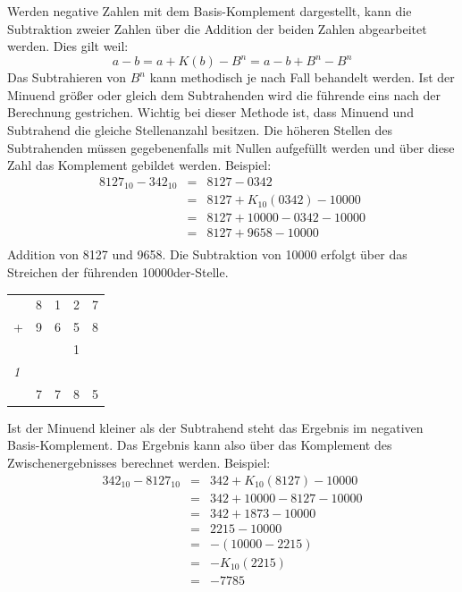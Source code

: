 \documentclass[11pt,a4paper]{scrreprt}
\begin{document}
Werden negative Zahlen mit dem Basis-Komplement dargestellt, kann die Subtraktion zweier Zahlen über die Addition der beiden Zahlen abgearbeitet werden. Dies gilt weil:
$$
  a - b = a + K(b) - B^n = a - b + B^n - B^n
$$
Das Subtrahieren von $B^n$ kann methodisch je nach Fall behandelt werden. Ist der Minuend größer oder gleich dem Subtrahenden  wird die führende eins nach der Berechnung gestrichen. Wichtig bei dieser Methode ist, dass Minuend und Subtrahend die gleiche Stellenanzahl besitzen. Die höheren Stellen des Subtrahenden müssen gegebenenfalls mit Nullen aufgefüllt werden und über diese Zahl das Komplement gebildet werden. Beispiel:
\begin{eqnarray*}
	8127_{10} - 342_{10} & = & 8127 - 0342                  \\
	                     & = & 8127 + K_{10}(0342) - 10000  \\
	                     & = & 8127 + 10000 - 0342 - 10000  \\
	                     & = & 8127 + 9658 - 10000  \\                
\end{eqnarray*}
Addition von 8127 und 9658. Die Subtraktion von 10000 erfolgt über das Streichen der führenden 10000der-Stelle.
\begin{center}
\begin{tabular}{lrrrr}
  & 8 & 1 & 2 & 7 \\
+ & 9 & 6 & 5 & 8 \\
\hline
  &   &   & 1 &   \\
\textit{1} &   &   &   &   \\
\hline
  & 7 & 7 & 8 & 5
\end{tabular}
\end{center}

Ist der Minuend kleiner als der Subtrahend  steht das Ergebnis im negativen Basis-Komplement. Das Ergebnis kann also über das Komplement des Zwischenergebnisses berechnet werden. Beispiel:
\begin{eqnarray*}
	342_{10} - 8127_{10} & = & 342 + K_{10}(8127) - 10000  \\
	                     & = & 342 + 10000 - 8127 - 10000  \\
	                     & = & 342 + 1873 - 10000          \\
	                     & = & 2215 - 10000                \\
	                     & = & -(10000 - 2215)             \\
	                     & = & -K_{10}(2215)               \\
	                     & = & -7785                       \\
\end{eqnarray*}
\end{document}
